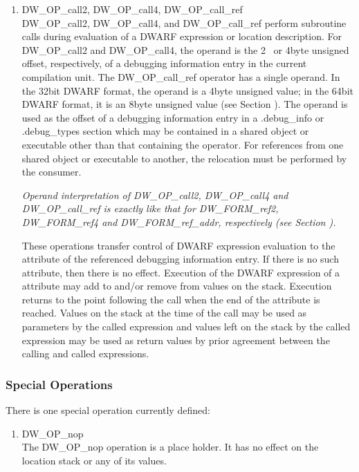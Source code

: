 \begin{enumerate}[1]
\item DW\-\_OP\-\_call2, DW\-\_OP\-\_call4, DW\-\_OP\-\_call\-\_ref \\
DW\-\_OP\-\_call2, DW\-\_OP\-\_call4, and DW\-\_OP\-\_call\-\_ref perform
subroutine calls during evaluation of a DWARF expression or
location description. 
For DW\-\_OP\-\_call2 and 
DW\-\_OP\-\_call4, 
the
operand is the 2\dash~ or 4\dash byte 
unsigned offset, respectively,
of a debugging information entry in the current compilation
unit. The DW\-\_OP\-\_call\-\_ref operator has a single operand. In the
32\dash bit DWARF format, the operand is a 4\dash byte unsigned value;
in the 64\dash bit DWARF format, it is an 8\dash byte unsigned value
(see Section ). 
The operand is used as the offset of a
debugging information entry in a .debug\_info or .debug\_types
section which may be contained in a shared object or executable
other than that containing the operator. For references from
one shared object or executable to another, the relocation
must be performed by the consumer.  

\textit{Operand interpretation of
DW\-\_OP\-\_call2, DW\-\_OP\-\_call4 and DW\-\_OP\-\_call\-\_ref is exactly like
that for DW\-\_FORM\-\_ref2, DW\-\_FORM\-\_ref4 and DW\-\_FORM\-\_ref\-\_addr,
respectively  
(see Section  ).  
}

These operations transfer
control of DWARF expression evaluation to the 
attribute of the referenced debugging information entry. If
there is no such attribute, then there is no effect. Execution
of the DWARF expression of a  attribute may add
to and/or remove from values on the stack. Execution returns
to the point following the call when the end of the attribute
is reached. Values on the stack at the time of the call may be
used as parameters by the called expression and values left on
the stack by the called expression may be used as return values
by prior agreement between the calling and called expressions.
\end{enumerate}


\subsubsection{Special Operations}
There is one special operation currently defined:
\begin{enumerate}[1]
\item DW\-\_OP\-\_nop \\
The DW\-\_OP\-\_nop operation is a place holder. It has no effect
on the location stack or any of its values.

\end{enumerate}
